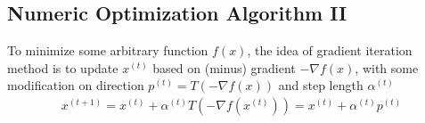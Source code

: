 














\subsection{Numeric Optimization Algorithm II}
    To minimize some arbitrary function $ f(x) $, the idea of gradient iteration method is to update $ x^{(t)} $ based on (minus) gradient $ -\nabla f(x) $, with some modification on direction $ p^{(t)}=T\left(-\nabla f(x)\right) $ and step length $ \alpha ^{(t)} $
    \begin{align}
        x^{(t+1)}=x^{(t)}+\alpha ^{(t)}T\left(-\nabla f(x^{(t)})\right)=x^{(t)}+\alpha ^{(t)}p^{(t)}
    \end{align}
    
